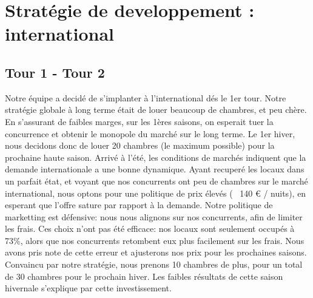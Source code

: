 \documentclass[a4paper,10pt]{article}
\begin{document}
      
   \newpage
   \section{Stratégie de developpement : international}
    
    \subsection{Tour 1 - Tour 2}
      Notre équipe a decidé de s'implanter à l'international dés le 1er tour.
      \newline
      Notre stratégie globale à long terme était de louer beaucoup de chambres, et peu chère. En s'assurant de faibles marges,
      sur les 1ères saisons, on esperait tuer la concurrence et obtenir le monopole du marché sur le long terme.
      \newline
      \newline
      Le 1er hiver, nous decidons donc de louer 20 chambres (le maximum possible) pour la prochaine haute saison.
      \newline
      \newline
      Arrivé à l'été, les conditions de marchés indiquent que la demande internationale a une bonne dynamique.
      Ayant recuperé les locaux dans un parfait état, et voyant que nos concurrents ont peu de chambres sur le marché international,
      nous optons pour une politique de prix élevés (~ 140 \euro{} / nuits), en esperant que l'offre sature par rapport à la demande.
      Notre politique de marketting est défensive: nous nous alignons sur nos concurrents, afin de limiter les frais.
      \newline
      Ces choix n'ont pas été efficace: nos locaux sont seulement occupés à 73\%, alors que nos concurrents retombent eux plus facilement sur les frais.
      Nous avons pris note de cette erreur et ajusterons nos prix pour les prochaines saisons.
      \newline
      \newline
      Convaincu par notre stratégie, nous prenons 10 chambres de plus, pour un total de 30 chambres pour le prochain hiver.
      \newline
      Les faibles résultats de cette saison hivernale s'explique par cette investissement.
\end{document}
